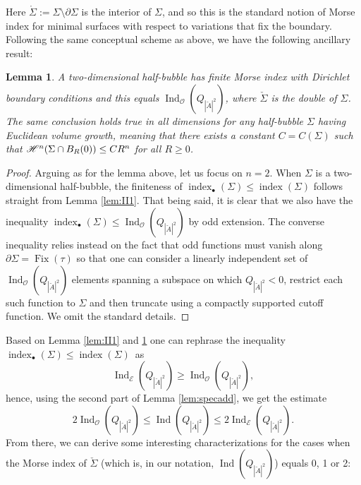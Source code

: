 \documentclass[JEP,XML,SOM,Unicode]{cedram}
\let\mathcal\mathscr
\newcounter{cas}
\newcommand{\sbullet}{{\scriptscriptstyle\bullet}}
\DeclareMathOperator{\Fix}{Fix}
\DeclareMathOperator{\indx}{index}
\DeclareMathOperator{\Ind}{Ind}
\newtheorem{lem}[thm]{Lemma}
\theoremstyle{definition}
\newcommand{\h}{\mathscr{H}}
\begin{document}
Here $\mathring{\Sigma}:=\Sigma\setminus\partial\Sigma$ is the interior of $\Sigma$, and so this is the standard notion of Morse index for minimal surfaces with respect to variations that fix the boundary. Following the same conceptual scheme as above, we have the following ancillary result:

\begin{lem}\label{lem:II2}
A two-dimensional half-bubble has finite Morse index \emph{with \hbox{Dirichlet} boundary conditions} and this equals $\Ind_{\mathcal{O}}(Q_{|\check{A}|^2})$, where $\check{\Sigma}$ is the double of $\Sigma$.
The same conclusion holds true in all dimensions for any half-bubble $\Sigma$ having \hbox{Euclidean} volume growth, meaning that there exists a constant $C=C(\Sigma)$ such that $\h^n(\Sigma\cap\nobreak B_R(0))\leq C R^n$ for all $R\geq 0$.
\end{lem}

\begin{proof}
Arguing as for the lemma above, let us focus on $n=2$. When $\Sigma$ is a two-dimensional half-bubble, the finiteness of $\indx_{\sbullet} (\Sigma)\leq \indx(\Sigma)$ follows straight from Lemma \ref{lem:II1}. That being said, it is clear that we also have the inequality
$\indx_{\sbullet} (\Sigma)\leq \Ind_{\mathcal{O}}(Q_{|\check{A}|^2})$ by odd extension. The converse inequality
relies instead on the fact that odd functions must vanish along $\partial\Sigma=\Fix(\tau)$ so that one can consider a linearly independent set of $\Ind_{\mathcal{O}}(Q_{|\check{A}|^2})$ elements spanning a subspace on which $Q_{|\check{A}|^2}<0$, restrict each such function to $\Sigma$ and then truncate using a compactly supported cutoff function. We omit the standard details.
\end{proof}

Based on Lemma \ref{lem:II1} and \ref{lem:II2} one can rephrase the inequality $\indx_{\sbullet} (\Sigma)\!\leq\!\indx(\Sigma)$~as
\begin{equation}\label{eq:EindexvsOindex}
\Ind_{\mathcal{E}}(Q_{|\check{A}|^2})\geq \Ind_{\mathcal{O}}(Q_{|\check{A}|^2}),
\end{equation}
hence, using the second part of Lemma \ref{lem:specadd}, we get the estimate
\begin{equation}\label{eq:fundineq}
2 \Ind_{\mathcal{O}}(Q_{|\check{A}|^2})\leq \Ind(Q_{|\check{A}|^2})\leq 2 \Ind_{\mathcal{E}}(Q_{|\check{A}|^2}).
\end{equation}
From there, we can derive some interesting characterizations for the cases when the Morse index of $\check{\Sigma}$ (which is, in our notation, $ \Ind(Q_{|\check{A}|^2})$) equals 0, 1 or 2:
\end{document}
